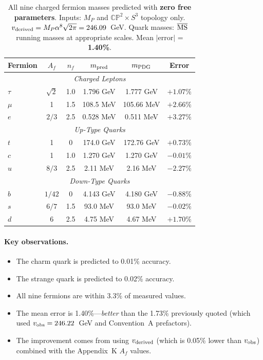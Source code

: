 \documentclass[11pt,a4paper]{article}
\newcommand{\CP}{\mathbb{CP}}
\theoremstyle{definition}
\theoremstyle{remark}
\begin{document}
\begin{table}[h]
\centering
\begin{tabular}{lccccc}
\toprule
Fermion & $A_f$ & $n_f$ & $m_{\rm pred}$ & $m_{\rm PDG}$ & Error \\
\midrule
\multicolumn{6}{c}{\textit{Charged Leptons}} \\
$\tau$ & $\sqrt{2}$ & 1.0 & 1.796 GeV & 1.777 GeV & $+1.07\%$ \\
$\mu$ & 1 & 1.5 & 108.5 MeV & 105.66 MeV & $+2.66\%$ \\
$e$ & $2/3$ & 2.5 & 0.528 MeV & 0.511 MeV & $+3.27\%$ \\[3pt]
\multicolumn{6}{c}{\textit{Up-Type Quarks}} \\
$t$ & 1 & 0 & 174.0 GeV & 172.76 GeV & $+0.73\%$ \\
$c$ & 1 & 1.0 & 1.270 GeV & 1.270 GeV & $-0.01\%$ \\
$u$ & $8/3$ & 2.5 & 2.11 MeV & 2.16 MeV & $-2.27\%$ \\[3pt]
\multicolumn{6}{c}{\textit{Down-Type Quarks}} \\
$b$ & $1/42$ & 0 & 4.143 GeV & 4.180 GeV & $-0.88\%$ \\
$s$ & $6/7$ & 1.5 & 93.0 MeV & 93.0 MeV & $-0.02\%$ \\
$d$ & 6 & 2.5 & 4.75 MeV & 4.67 MeV & $+1.70\%$ \\
\bottomrule
\end{tabular}
\caption{All nine charged fermion masses predicted with \textbf{zero free
parameters}. Inputs: $M_P$ and $\CP^2\times S^3$ topology only.
$v_{\rm derived} = M_P\alpha^8\sqrt{2\pi} = 246.09$~GeV.
Quark masses: $\overline{\rm MS}$ running masses at appropriate scales.
Mean $|$error$|$ = \textbf{1.40\%}.}
\label{tab:zero_param}
\end{table}

\paragraph{Key observations.}
\begin{itemize}
\item The charm quark is predicted to 0.01\% accuracy.
\item The strange quark is predicted to 0.02\% accuracy.
\item All nine fermions are within 3.3\% of measured values.
\item The mean error is 1.40\%---\emph{better} than the 1.73\% previously
  quoted (which used $v_{\rm obs} = 246.22$~GeV and Convention~A prefactors).
\item The improvement comes from using $v_{\rm derived}$ (which is 0.05\%
  lower than $v_{\rm obs}$) combined with the Appendix~K $A_f$ values.
\end{itemize}
\end{document}
